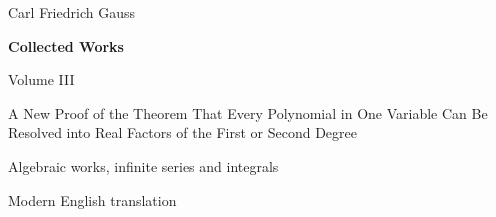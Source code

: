 \begin{titlepage}\centering
{\Large Carl Friedrich Gauss\par}\bigskip
{\LARGE\bfseries Collected Works\par}\bigskip
{\Large Volume III\par}\bigskip
{\large A New Proof of the Theorem That Every Polynomial in One Variable Can Be Resolved into Real Factors of the First or Second Degree\par}\bigskip
{\large Algebraic works, infinite series and integrals\par}\bigskip
Modern English translation\par\bigskip
\end{titlepage}
\clearpage\thispagestyle{empty}\medskip
\begingroup\fontsize{9.5}{10.2}\selectfont\raggedright
